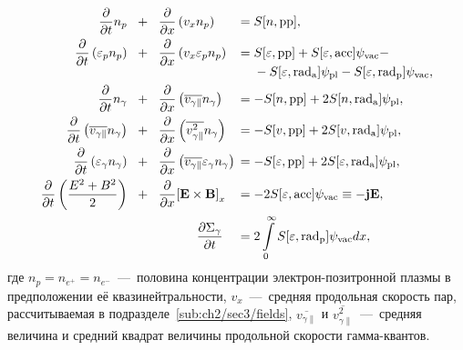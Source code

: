 \begin{align}
    \label{eq:ch2/hd_p1}
    \frac{\partial }{\partial t}n_p  \quad &\!+\!& &\frac{\partial}{\partial x}\left( v_x n_p \right) \!\!\!&\!&\!=  S[n, \mathrm{pp}] ,\\
    \label{eq:ch2/hd_p2}
    \frac{\partial}{\partial t}\left( \varepsilon_p n_p \right)   \quad &\!+\!& & \frac{\partial}{\partial x}\left( v_x \varepsilon_p n_p \right) \!\!\!&\!&\!=
    \begin{aligned}[t]
        & S[\varepsilon, \mathrm{pp}] + S[\varepsilon, \mathrm{\mathrm{acc}}] \psi_\mathrm{vac} - \\
        & - S[\varepsilon, \mathrm{rad_a}] \psi_\mathrm{pl} - S[\varepsilon, \mathrm{rad_p}] \psi_\mathrm{vac} ,
    \end{aligned} \\
    \label{eq:ch2/hd_g1}
    \frac{\partial }{\partial t}n_\gamma  \quad &\!+\!& &\frac{\partial}{\partial x}\left( \overline{v_{\gamma\parallel}} n_\gamma \right)\!\!\!&\!&\!= -S[n, \mathrm{pp}] + 2 S[n, \mathrm{rad_a}] \psi_\mathrm{pl} ,\\
    \label{eq:ch2/hd_g2}
    \frac{\partial}{\partial t}\left( \overline{v_{\gamma\parallel}} n_\gamma \right) \quad &\!+\!& & \frac{\partial}{\partial x}\left( \overline{v_{\gamma\parallel}^2} n_\gamma \right) \!\!\!&\!&\!=  -S[v, \mathrm{pp}] + 2 S[v, \mathrm{rad_a}] \psi_\mathrm{pl} ,\\
    \label{eq:ch2/hd_g3}
    \frac{\partial}{\partial t}\left( \varepsilon_\gamma n_\gamma \right) \quad &\!+\!& &\frac{\partial}{\partial x}\left( \overline{v_{\gamma\parallel}} \varepsilon_\gamma n_\gamma \right) \!\!\!&\!&\!= -S[\varepsilon, \mathrm{pp}] + 2 S[\varepsilon, \mathrm{rad_a}] \psi_\mathrm{pl} ,\\
    \label{eq:ch2/hd_e1}
    \frac{\partial }{\partial t}\left( \frac{E^2 + B^2}{2} \right) \quad &\!+\!& &\frac{\partial}{\partial x} {\left[ \vb{E\times B} \right]}_x \!\!\!&\!&\!= - 2 S[\varepsilon, \mathrm{\mathrm{acc}}]\psi_\mathrm{vac} \equiv - \vb{jE} ,\\
    && & \qquad\quad \frac{\partial \Sigma_\gamma}{\partial t} \!\!\!&\!&\!= 2 \int\limits_0^\infty S[\varepsilon, \mathrm{rad_p}]\psi_\mathrm{vac} dx ,
\end{align}
где $n_p = n_{e^+} = n_{e^-}$~---~половина концентрации электрон-позитронной плазмы в предположении её квазинейтральности, $v_x$~---~средняя продольная скорость пар, рассчитываемая в подразделе~\ref{sub:ch2/sec3/fields}, $\overline{v_{\gamma\parallel}}$ и $\overline{v_{\gamma\parallel}^2}$~---~средняя величина и средний квадрат величины продольной скорости гамма-квантов.
